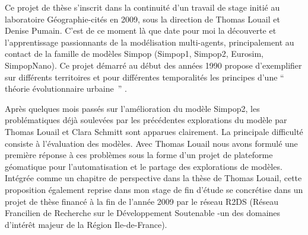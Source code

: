 
Ce projet de thèse s'inscrit dans la continuité d'un travail de stage initié au laboratoire Géographie-cités en 2009, sous la direction de Thomas Louail et Denise Pumain. C'est de ce moment là que date pour moi la découverte et l'apprentissage passionnants de la modélisation multi-agents, principalement au contact de la famille de modèles Simpop (Simpop1, Simpop2, Eurosim, SimpopNano). Ce projet démarré au début des années 1990 propose d'exemplifier sur différents territoires et pour différentes temporalités les principes d'une \enquote{ théorie évolutionnaire urbaine } \autocite{Pumain1997}.⁠⁠ 

Après quelques mois passés sur l'amélioration du modèle Simpop2, les problématiques déjà soulevées par les précédentes explorations du modèle par Thomas Louail et Clara Schmitt sont apparues clairement. La principale difficulté consiste à l’évaluation des modèles. Avec Thomas Louail nous avons formulé une première réponse à ces problèmes sous la forme d'un projet de plateforme géomatique pour l'automatisation et le partage des explorations de modèles. Intégrée comme un chapitre de perspective dans la thèse de Thomas Louail, cette proposition également reprise dans mon stage de fin d'étude se concrétise dans un projet de thèse financé à la fin de l'année 2009 \autocite{Rey2009} par le réseau R2DS (Réseau Francilien de Recherche sur le Développement Soutenable -un des domaines d’intérêt majeur de la Région Ile-de-France).

